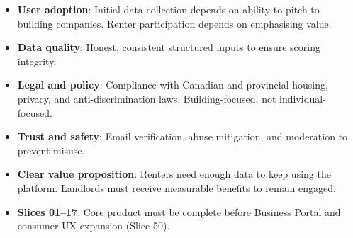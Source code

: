 \documentclass[11pt,letterpaper]{article}
\begin{document}
\begin{itemize}
    \item \textbf{User adoption}: Initial data collection depends on ability to pitch to building companies. Renter participation depends on emphasising value.
    \item \textbf{Data quality}: Honest, consistent structured inputs to ensure scoring integrity.
    \item \textbf{Legal and policy}: Compliance with Canadian and provincial housing, privacy, and anti-discrimination laws. Building-focused, not individual-focused.
    \item \textbf{Trust and safety}: Email verification, abuse mitigation, and moderation to prevent misuse.
    \item \textbf{Clear value proposition}: Renters need enough data to keep using the platform. Landlords must receive measurable benefits to remain engaged.
    \item \textbf{Slices 01--17}: Core product must be complete before Business Portal and consumer UX expansion (Slice 50).
\end{itemize}
\end{document}
